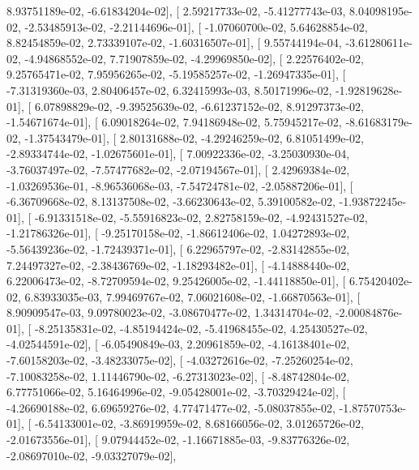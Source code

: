 \documentclass{article}
\begin{document}
          8.93751189e-02,  -6.61834204e-02],
       [  2.59217733e-02,  -5.41277743e-03,   8.04098195e-02,
         -2.53485913e-02,  -2.21144696e-01],
       [ -1.07060700e-02,   5.64628854e-02,   8.82454859e-02,
          2.73339107e-02,  -1.60316507e-01],
       [  9.55744194e-04,  -3.61280611e-02,  -4.94868552e-02,
          7.71907859e-02,  -4.29969850e-02],
       [  2.22576402e-02,   9.25765471e-02,   7.95956265e-02,
         -5.19585257e-02,  -1.26947335e-01],
       [ -7.31319360e-03,   2.80406457e-02,   6.32415993e-03,
          8.50171996e-02,  -1.92819628e-01],
       [  6.07898829e-02,  -9.39525639e-02,  -6.61237152e-02,
          8.91297373e-02,  -1.54671674e-01],
       [  6.09018264e-02,   7.94186948e-02,   5.75945217e-02,
         -8.61683179e-02,  -1.37543479e-01],
       [  2.80131688e-02,  -4.29246259e-02,   6.81051499e-02,
         -2.89334744e-02,  -1.02675601e-01],
       [  7.00922336e-02,  -3.25030930e-04,  -3.76037497e-02,
         -7.57477682e-02,  -2.07194567e-01],
       [  2.42969384e-02,  -1.03269536e-01,  -8.96536068e-03,
         -7.54724781e-02,  -2.05887206e-01],
       [ -6.36709668e-02,   8.13137508e-02,  -3.66230643e-02,
          5.39100582e-02,  -1.93872245e-01],
       [ -6.91331518e-02,  -5.55916823e-02,   2.82758159e-02,
         -4.92431527e-02,  -1.21786326e-01],
       [ -9.25170158e-02,  -1.86612406e-02,   1.04272893e-02,
         -5.56439236e-02,  -1.72439371e-01],
       [  6.22965797e-02,  -2.83142855e-02,   7.24497327e-02,
         -2.38436769e-02,  -1.18293482e-01],
       [ -4.14888440e-02,   6.22006473e-02,  -8.72709594e-02,
          9.25426005e-02,  -1.44118850e-01],
       [  6.75420402e-02,   6.83933035e-03,   7.99469767e-02,
          7.06021608e-02,  -1.66870563e-01],
       [  8.90909547e-03,   9.09780023e-02,  -3.08670477e-02,
          1.34314704e-02,  -2.00084876e-01],
       [ -8.25135831e-02,  -4.85194424e-02,  -5.41968455e-02,
          4.25430527e-02,  -4.02544591e-02],
       [ -6.05490849e-03,   2.20961859e-02,  -4.16138401e-02,
         -7.60158203e-02,  -3.48233075e-02],
       [ -4.03272616e-02,  -7.25260254e-02,  -7.10083258e-02,
          1.11446790e-02,  -6.27313023e-02],
       [ -8.48742804e-02,   6.77751066e-02,   5.16464996e-02,
         -9.05428001e-02,  -3.70329424e-02],
       [ -4.26690188e-02,   6.69659276e-02,   4.77471477e-02,
         -5.08037855e-02,  -1.87570753e-01],
       [ -6.54133001e-02,  -3.86919959e-02,   8.68166056e-02,
          3.01265726e-02,  -2.01673556e-01],
       [  9.07944452e-02,  -1.16671885e-03,  -9.83776326e-02,
         -2.08697010e-02,  -9.03327079e-02],
\end{document}
